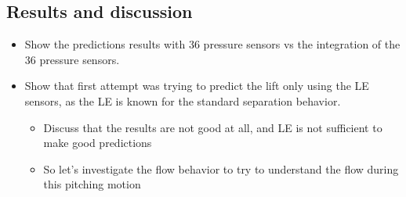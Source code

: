 \documentclass[%
 reprint,
 amsmath,amssymb,
 aps,
]{revtex4-2}
\begin{document}
\subsection{Results and discussion}

\begin{itemize} 
    \item Show the predictions results with 36 pressure sensors vs the integration of the 36 pressure sensors.

    \item  Show that first attempt was trying to predict the lift only using the LE sensors, as the LE is known for the standard separation behavior.
        \begin{itemize} 
        \item  Discuss that the results are not good at all, and LE is not sufficient to make good predictions
        \item So let's investigate the flow behavior to try to understand the flow during this pitching motion 
        \end{itemize}


\end{itemize}
\end{document}
